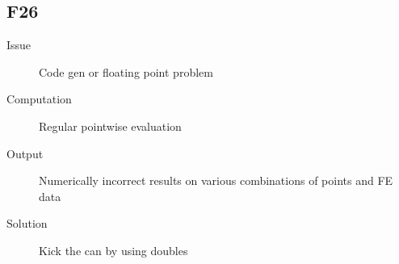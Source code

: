 \subsection{F26}

\begin{description}
\item[Issue] Code gen or floating point problem
\item[Computation] Regular pointwise evaluation
\item[Output] Numerically incorrect results on various combinations of points and FE data
\item[Solution] Kick the can by using doubles
\end{description}
